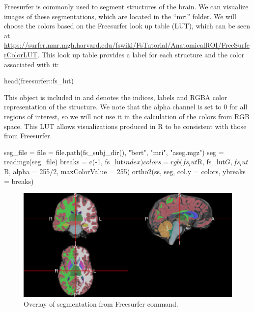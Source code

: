 Freesurfer is commonly used to segment structures of the brain. We can
visualize images of these segmentations, which are located in the
``mri'' folder. We will choose the colors based on the Freesurfer look
up table (LUT), which can be seen at
\url{https://surfer.nmr.mgh.harvard.edu/fswiki/FsTutorial/AnatomicalROI/FreeSurferColorLUT}.
This look up table provides a label for each structure and the color
associated with it:

\begin{Schunk}
\begin{Sinput}
head(freesurfer::fs_lut)
\end{Sinput}
\end{Schunk}

This object is included in  and denotes the indices,
labels and RGBA color representation of the structure. We note that the
alpha channel is set to \(0\) for all regions of interest, so we will
not use it in the calculation of the colors from RGB space. This LUT
allows visualizations produced in R to be consistent with those from
Freesurfer.\\

\begin{Schunk}
\begin{Sinput}
seg_file = file = file.path(fs_subj_dir(), "bert", "mri", "aseg.mgz")
seg = readmgz(seg_file)
breaks = c(-1, fs_lut$index)
colors = rgb(fs_lut$R, fs_lut$G, fs_lut$B, 
             alpha = 255/2,
             maxColorValue = 255)
ortho2(ss, seg, col.y = colors, ybreaks = breaks)
\end{Sinput}
\end{Schunk}

\begin{Schunk}
\begin{figure}
\includegraphics{Freesurfer_files/figure-latex/seg_file-1} \caption[Overlay of segmentation from Freesurfer  command]{Overlay of segmentation from Freesurfer  command.  }\label{fig:seg_file}
\end{figure}
\end{Schunk}

